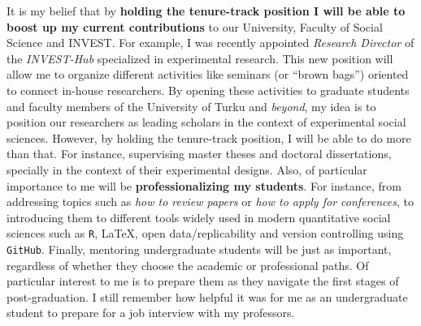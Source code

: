 \documentclass[10pt,stdletter,dateno,sigleft]{newlfm} %
\begin{document}
\begin{newlfm}
It is my belief that by {\bf holding the tenure-track position I will be able to boost up my current contributions} to our University, Faculty of Social Science and INVEST. For example, I was recently appointed \emph{Research Director} of the \emph{INVEST-Hub} specialized in experimental research. This new position will allow me to organize different activities like seminars (or ``brown bags'') oriented to connect in-house researchers. By opening these activities to graduate students and faculty members of the University of Turku and \emph{beyond}, my idea is to position our researchers as leading scholars in the context of experimental social sciences. However, by holding the tenure-track position, I will be able to do more than that. For instance, supervising master theses and doctoral dissertations, specially in the context of their experimental designs. Also, of particular importance to me will be {\bf professionalizing my students}. For instance, from addressing topics such as \emph{how to review papers} or \emph{how to apply for conferences}, to introducing them to different tools widely used in modern quantitative social sciences such as \texttt{R}, \LaTeX\;, open data/replicability and version controlling using \texttt{GitHub}. Finally, mentoring undergraduate students will be just as important, regardless of whether they choose the academic or professional paths. Of particular interest to me is to prepare them as they navigate the first stages of post-graduation. I still remember how helpful it was for me as an undergraduate student to prepare for a job interview with my professors.


\end{newlfm}
\end{document}
